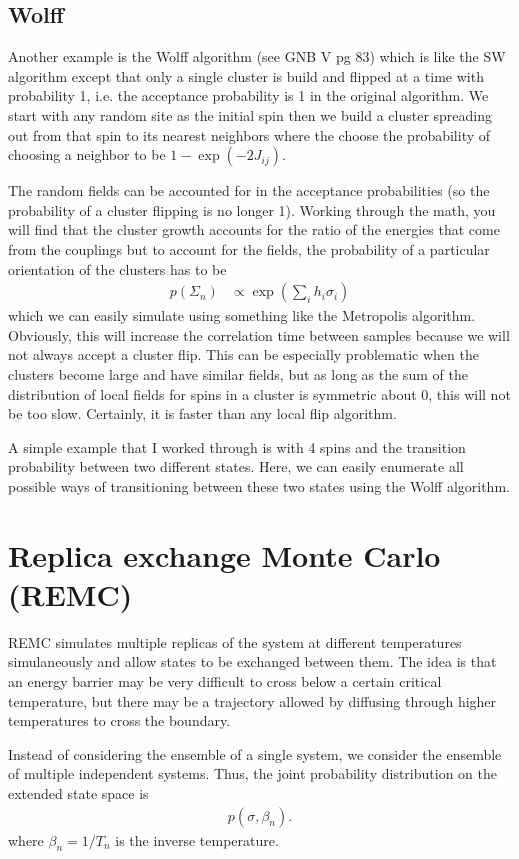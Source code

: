 \documentclass[11pt]{amsart}
\begin{document}
\subsection{Wolff}
Another example is the Wolff algorithm (see GNB V pg 83) which is like the SW algorithm except that only a single cluster is build and flipped at a time with probability 1, i.e. the acceptance probability is 1 in the original algorithm. We start with any random site as the initial spin then we build a cluster spreading out from that spin to its nearest neighbors where the choose the probability of choosing a neighbor to be $1-\exp(-2J_{ij})$.

The random fields can be accounted for in the acceptance probabilities (so the probability of a cluster flipping is no longer 1). Working through the math, you will find that the cluster growth accounts for the ratio of the energies that come from the couplings but to account for the fields, the probability of a particular orientation of the clusters has to be
\begin{align}
	p(\Sigma_n) &\propto \exp\left(\sum_i h_i\sigma_i\right)
\end{align}
which we can easily simulate using something like the Metropolis algorithm. Obviously, this will increase the correlation time between samples because we will not always accept a cluster flip. This can be especially problematic when the clusters become large and have similar fields, but as long as the sum of the distribution of local fields for spins in a cluster is symmetric about 0, this will not be too slow. Certainly, it is faster than any local flip algorithm.

A simple example that I worked through is with 4 spins and the transition probability between two different states. Here, we can easily enumerate all possible ways of transitioning between these two states using the Wolff algorithm.

\section{Replica exchange Monte Carlo (REMC)}
REMC simulates multiple replicas of the system at different temperatures simulaneously and allow states to be exchanged between them. The idea is that an energy barrier may be very difficult to cross below a certain critical temperature, but there may be a trajectory allowed by diffusing through higher temperatures to cross the boundary.

Instead of considering the ensemble of a single system, we consider the ensemble of multiple independent systems. Thus, the joint probability distribution on the extended state space is
\begin{align}
	p(\sigma,\beta_n).
\end{align}
where $\beta_n = 1/T_n$ is the inverse temperature.
\end{document}
